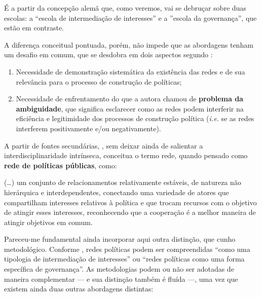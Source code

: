 \documentclass[
article,			%
11pt,				%
oneside,			%
a4paper,			%
english,			%
brazil,				%
sumario=tradicional
]{abntex2}
\begin{document}
	É a partir da concepção alemã que, como veremos,  vai se debruçar sobre duas escolas: a ``escola de intermediação de interesses'' e a ''escola da governança'', que estão em contraste.

	A diferença conceitual pontuada, porém, não impede que as abordagens tenham um desafio em comum, que se desdobra em dois aspectos segundo :
	
	\begin{enumerate}
		\item Necessidade de demonstração sistemática da existência das redes e de sua relevância para o processo de construção de políticas;
		\item Necessidade de enfrentamento do que a autora chamou de \textbf{problema da ambiguidade}, que significa esclarecer como as redes podem interferir na eficiência e legitimidade dos processos de construção política (\textit{i.e.} se as redes interferem positivamente e/ou negativamente).
	\end{enumerate}

	A partir de fontes secundárias, \cite[p. 218--219]{borzel2008a}, sem deixar ainda de salientar a interdisciplinaridade intrínseca, conceitua o termo rede, quando pensado como \textbf{rede de políticas públicas}, como:
	
	\begin{citacao}
		(\dots) um conjunto de relacionamentos relativamente estáveis, de natureza não hierárquica e interdependentes, conectando uma variedade de atores que compartilham interesses relativos à política	e que trocam recursos com o objetivo de atingir esses interesses, reconhecendo que a cooperação é a melhor maneira de atingir objetivos em comum. \cite[p. 220]{borzel2008a}
	\end{citacao}

	Pareceu-me fundamental ainda incorporar aqui outra distinção, que cunho metodológico. Conforme , redes políticas podem ser compreendidas ``como uma tipologia de intermediação de interesses'' ou ``redes políticas como uma forma específica de governança''. As metodologias podem ou não ser adotadas de maneira complementar --- e sua distinção também é fluída \cite[p. 223]{borzel2008a} ---, uma vez que existem ainda duas outras abordagens distintas:
	
\end{document}
